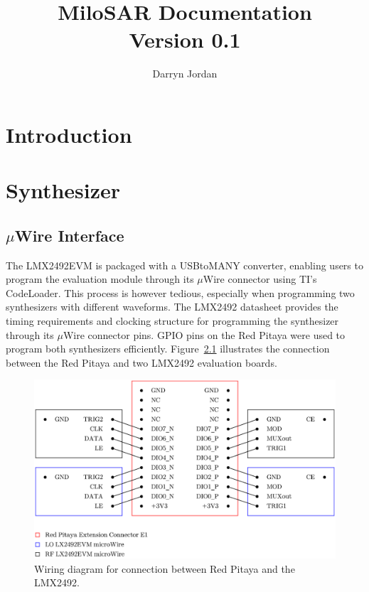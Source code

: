 \documentclass[a4paper,11pt]{report}
\title{MiloSAR Documentation \\ \vspace{0.5cm} \Large Version 0.1}
\author{Darryn Jordan}
\begin{document}
\maketitle
\tableofcontents

\chapter{Introduction}

\chapter{Synthesizer}

\section{$ \mu $Wire Interface}

The LMX2492EVM is packaged with a USBtoMANY converter, enabling users to program the evaluation module through its $ \mu $Wire connector using TI's CodeLoader. This process is however tedious, especially when programming two synthesizers with different waveforms. The LMX2492 datasheet provides the timing requirements and clocking structure for programming the synthesizer through its $ \mu $Wire connector pins. GPIO pins on the Red Pitaya were used to program both synthesizers efficiently. Figure~\ref{fig:rp_synth_connect} illustrates the connection between the Red Pitaya and two LMX2492 evaluation boards.
\begin{figure}[h!]
    \begin{center}
        \includegraphics[width=\textwidth]{images/rp_synth_connections.pdf}
        \caption{Wiring diagram for connection between Red Pitaya and the LMX2492.}
        \label{fig:rp_synth_connect}
    \end{center}
\end{figure}
\end{document}
